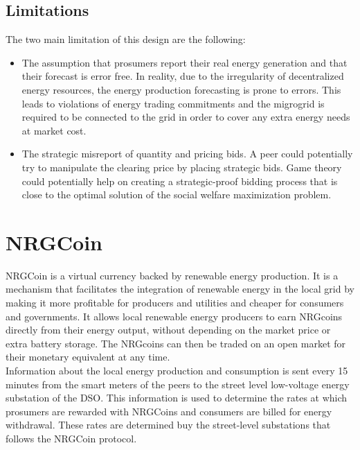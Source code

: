 \subsection{Limitations}
The two main limitation of this design are the following:
\begin{itemize}
    \item The assumption that prosumers report their real energy generation and that their forecast is error free. In reality, due
          to the irregularity of decentralized energy resources, the energy production forecasting is prone to errors. This leads to violations of energy trading
          commitments and the migrogrid is required to be connected to the grid in order to cover any extra energy needs at market cost.
    \item The strategic misreport of quantity and pricing bids. A peer could potentially try to manipulate the clearing price by placing strategic bids.
          Game theory could potentially help on creating a strategic-proof bidding process that is close to the optimal solution of the social welfare maximization
          problem.
\end{itemize}

\section{NRGCoin}
\label{sec:nrgc}
NRGCoin is a virtual currency backed by renewable energy production. It is a mechanism that facilitates the integration of renewable energy in the local grid
by making it more profitable for producers and utilities and cheaper for consumers and governments.
It allows local renewable energy producers to earn NRGcoins directly from their energy output, without depending on the market price or extra battery storage.
The NRGcoins can then be traded on an open market for their monetary equivalent at any time.\\
Information about the local energy production and consumption is sent every 15 minutes from the smart meters of the peers to the
street level low-voltage energy substation of the DSO. This information is used to determine the rates at which prosumers are rewarded with NRGCoins and
consumers are billed for energy withdrawal. These rates are determined buy the street-level substations that follows the NRGCoin protocol.
\cite{NRGCoin}


